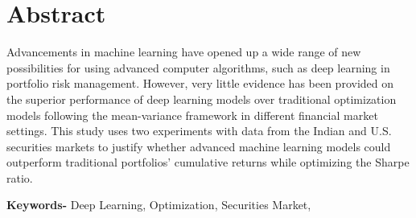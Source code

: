 \newpage
\newpage
{}
\section*{Abstract}
Advancements in machine learning have opened up a wide range of new possibilities for using advanced computer algorithms, such as deep learning in portfolio risk management. However, very little evidence has been provided on the superior performance of deep learning models over traditional optimization models following the mean-variance framework in different financial market settings. This study uses two experiments with data from the Indian and U.S. securities markets to justify whether advanced machine learning models could outperform traditional portfolios' cumulative returns while optimizing the Sharpe ratio.

\textbf{Keywords-} Deep Learning, Optimization, Securities Market, 
